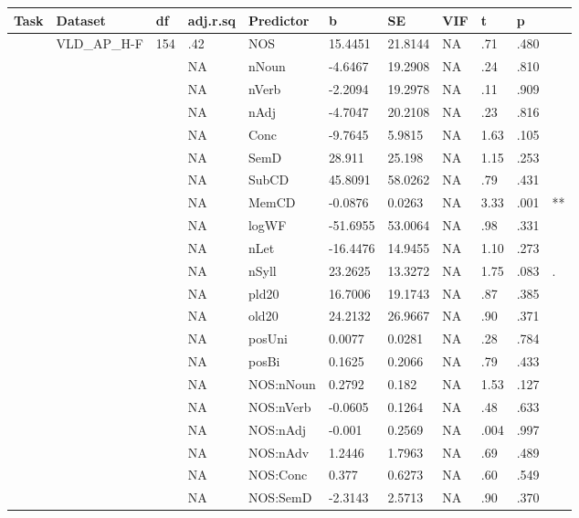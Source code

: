 \begin{table}[ht]
\centering
\begingroup\normalsize
\begin{tabular}{lllllllllll}
  \hline
Task & Dataset & df & adj.r.sq & Predictor & b & SE & VIF & t & p &  \\ 
  \hline
 & VLD\_AP\_H-F & 154 & .42 & NOS & 15.4451 & 21.8144 & NA & .71 & .480 &   \\ 
   &  &  & NA & nNoun & -4.6467 & 19.2908 & NA & .24 & .810 &   \\ 
   &  &  & NA & nVerb & -2.2094 & 19.2978 & NA & .11 & .909 &   \\ 
   &  &  & NA & nAdj & -4.7047 & 20.2108 & NA & .23 & .816 &   \\ 
   &  &  & NA & Conc & -9.7645 & 5.9815 & NA & 1.63 & .105 &   \\ 
   &  &  & NA & SemD & 28.911 & 25.198 & NA & 1.15 & .253 &   \\ 
   &  &  & NA & SubCD & 45.8091 & 58.0262 & NA & .79 & .431 &   \\ 
   &  &  & NA & MemCD & -0.0876 & 0.0263 & NA & 3.33 & .001 & ** \\ 
   &  &  & NA & logWF & -51.6955 & 53.0064 & NA & .98 & .331 &   \\ 
   &  &  & NA & nLet & -16.4476 & 14.9455 & NA & 1.10 & .273 &   \\ 
   &  &  & NA & nSyll & 23.2625 & 13.3272 & NA & 1.75 & .083 & . \\ 
   &  &  & NA & pld20 & 16.7006 & 19.1743 & NA & .87 & .385 &   \\ 
   &  &  & NA & old20 & 24.2132 & 26.9667 & NA & .90 & .371 &   \\ 
   &  &  & NA & posUni & 0.0077 & 0.0281 & NA & .28 & .784 &   \\ 
   &  &  & NA & posBi & 0.1625 & 0.2066 & NA & .79 & .433 &   \\ 
   &  &  & NA & NOS:nNoun & 0.2792 & 0.182 & NA & 1.53 & .127 &   \\ 
   &  &  & NA & NOS:nVerb & -0.0605 & 0.1264 & NA & .48 & .633 &   \\ 
   &  &  & NA & NOS:nAdj & -0.001 & 0.2569 & NA & .004 & .997 &   \\ 
   &  &  & NA & NOS:nAdv & 1.2446 & 1.7963 & NA & .69 & .489 &   \\ 
   &  &  & NA & NOS:Conc & 0.377 & 0.6273 & NA & .60 & .549 &   \\ 
   &  &  & NA & NOS:SemD & -2.3143 & 2.5713 & NA & .90 & .370 &   \\ 

\end{tabular}
\end{table}
